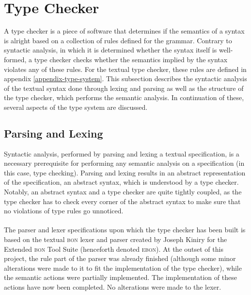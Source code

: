 \section{Type Checker}
A type checker is a piece of software that determines if the semantics of a syntax is alright based on a collection of rules defined for the grammar. Contrary to syntactic analysis, in which it is determined whether the syntax itself is well-formed, a type checker checks whether the semantics implied by the syntax violates any of these rules. For the textual \bon{} type checker, these rules are defined in appendix \ref{appendix-type-system}. This subsection describes the syntactic analysis of the textual \bon{} syntax done through lexing and parsing as well as the structure of the type checker, which performs the semantic analysis. In continuation of these, several aspects of the type system are discussed.
\subsection{Parsing and Lexing}
\label{design-parsing}
Syntactic analysis, performed by parsing and lexing a textual \bon{} specification, is a necessary prerequisite for performing any semantic analysis on a specification (in this case, type checking). Parsing and lexing results in an abstract representation of the specification, an abstract syntax, which is understood by a type checker. Notably, an abstract syntax and a type checker are quite tightly coupled, as the type checker has to check every corner of the abstract syntax to make sure that no violations of type rules go unnoticed.
\paragraph{}
The parser and lexer specifications upon which the type checker has been built is based on the textual \textsc{bon} lexer and parser created by Joseph Kiniry for the Extended \textsc{bon} Tool Suite \cite{ebon} (henceforth denoted \textsc{ebon}). At the outset of this project, the rule part of the parser was already finished (although some minor alterations were made to it to fit the implementation of the type checker), while the semantic actions were partially implemented. The implementation of these actions have now been completed. No alterations were made to the lexer.

